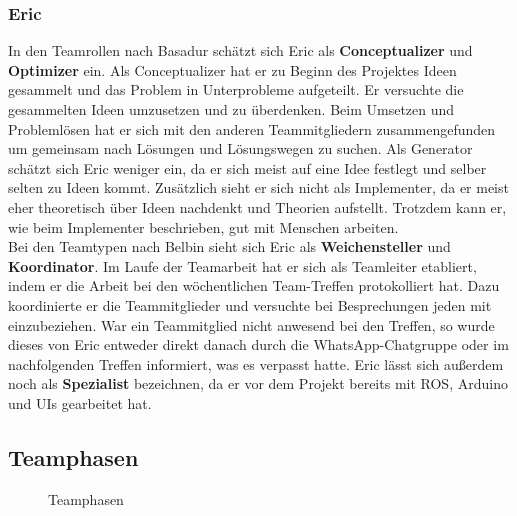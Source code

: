 \documentclass[a4paper,12pt,headsepline]{scrartcl}
\begin{document}
		\subsubsection{Eric}
		In den Teamrollen nach Basadur schätzt sich Eric als \textbf{Conceptualizer} und \textbf{Optimizer} ein. Als Conceptualizer hat er zu Beginn des Projektes Ideen gesammelt und das Problem in Unterprobleme aufgeteilt. Er versuchte die gesammelten Ideen umzusetzen und zu überdenken. Beim Umsetzen und Problemlösen hat er sich mit den anderen Teammitgliedern zusammengefunden um gemeinsam nach Lösungen und Lösungswegen zu suchen. Als Generator schätzt sich Eric weniger ein, da er sich meist auf eine Idee festlegt und selber selten zu Ideen kommt. Zusätzlich sieht er sich nicht als Implementer, da er meist eher theoretisch über Ideen nachdenkt und Theorien aufstellt. Trotzdem kann er, wie beim Implementer beschrieben, gut mit Menschen arbeiten.\\
		Bei den Teamtypen nach Belbin sieht sich Eric als \textbf{Weichensteller} und \textbf{Koordinator}. Im Laufe der Teamarbeit hat er sich als Teamleiter etabliert, indem er die Arbeit bei den wöchentlichen Team-Treffen protokolliert hat. Dazu koordinierte er die Teammitglieder und versuchte bei Besprechungen jeden mit einzubeziehen. War ein Teammitglied nicht anwesend bei den Treffen, so wurde dieses von Eric entweder direkt danach durch die WhatsApp-Chatgruppe oder im nachfolgenden Treffen informiert, was es verpasst hatte. Eric lässt sich außerdem noch als \textbf{Spezialist} bezeichnen, da er vor dem Projekt bereits mit ROS, Arduino und UIs gearbeitet hat.\\
		

\subsection{Teamphasen}
		\begin{figure}[H]
			\centering
			\resizebox{0.5\textwidth}{!}{}
			\caption{Teamphasen}
			\label{fig:teamphasen}
		\end{figure}
		
\end{document}
